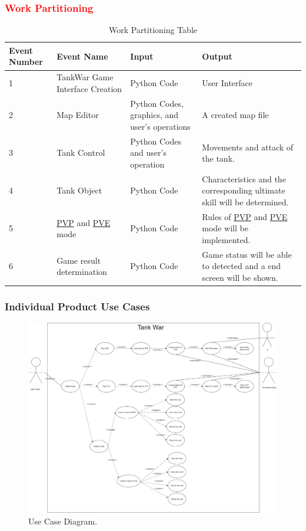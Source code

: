 \documentclass[12pt, titlepage]{article}
\begin{document}
\subsubsection{\textcolor{red}{Work Partitioning}}
\begin{table}[H]
\begin{tabular}{|p{3cm}|p{3cm}|p{3cm}|p{3cm}|}
 \hline
 Event Number & Event Name & Input & Output\\ 
 \hline
 1 & TankWar Game Interface Creation& Python Code & User Interface\\ 
 \hline
 2 & Map Editor & Python Codes, graphics, and user's operations & A created map file \\ 
 \hline
 3 & Tank Control & Python Codes and user's operation & Movements and attack of the tank. \\
 \hline
 4 & Tank Object & Python Code & Characteristics and the corresponding ultimate skill will be determined.\\
 \hline
 5 & \underline{PVP} and \underline{PVE} mode & Python Code & Rules of \underline{PVP} and \underline{PVE} mode will be implemented.\\
  \hline
 6 & Game result determination & Python Code & Game status will be able to detected and a end screen will be shown.\\
  \hline
\end{tabular}
\caption{Work Partitioning Table}
\label{table:Work Partitioning Table}
\end{table}

\subsubsection{Individual Product Use Cases}
\newpage
\begin{figure}[H]
  \includegraphics[width=1.4\linewidth, angle =270]{UC.jpg}
  \caption{Use Case Diagram.}
  \label{fig:use case1}
\end{figure}
\end{document}

